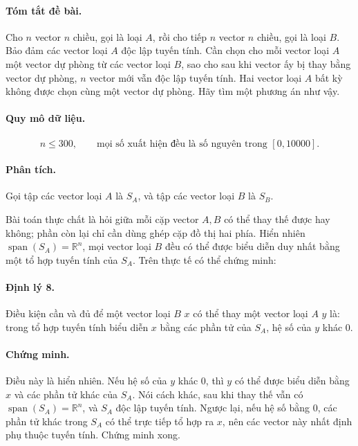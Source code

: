 \documentclass[11pt]{article}
\begin{document}
\paragraph{Tóm tắt đề bài.}
Cho \(n\) vector \(n\) chiều, gọi là loại \(A\), rồi cho tiếp \(n\) vector
\(n\) chiều, gọi là loại \(B\). Bảo đảm các vector loại \(A\) độc lập tuyến
tính. Cần chọn cho mỗi vector loại \(A\) một vector dự phòng từ các vector loại
\(B\), sao cho sau khi vector ấy bị thay bằng vector dự phòng, \(n\) vector mới
vẫn độc lập tuyến tính. Hai vector loại \(A\) bất kỳ không được chọn cùng một
vector dự phòng. Hãy tìm một phương án như vậy.

\paragraph{Quy mô dữ liệu.}
\[
  n\le300,\qquad \text{mọi số xuất hiện đều là số nguyên trong }[0,10000].
\]

\paragraph{Phân tích.}
Gọi tập các vector loại \(A\) là \(S_A\), và tập các vector loại \(B\) là
\(S_B\).

Bài toán thực chất là hỏi giữa mỗi cặp vector \(A,B\) có thể thay thế được hay
không; phần còn lại chỉ cần dùng ghép cặp đồ thị hai phía. Hiển nhiên
\(\operatorname{span}(S_A)=\mathbb{R}^n\), mọi vector loại \(B\) đều có thể được
biểu diễn duy nhất bằng một tổ hợp tuyến tính của \(S_A\). Trên thực tế có thể
chứng minh:

\paragraph{Định lý 8.}
Điều kiện cần và đủ để một vector loại \(B\) \(x\) có thể thay một vector loại
\(A\) \(y\) là: trong tổ hợp tuyến tính biểu diễn \(x\) bằng các phần tử của
\(S_A\), hệ số của \(y\) khác \(0\).

\paragraph{Chứng minh.}
Điều này là hiển nhiên. Nếu hệ số của \(y\) khác \(0\), thì \(y\) có thể được
biểu diễn bằng \(x\) và các phần tử khác của \(S_A\). Nói cách khác, sau khi
thay thế vẫn có \(\operatorname{span}(S_A)=\mathbb{R}^n\), và \(S_A\) độc lập
tuyến tính. Ngược lại, nếu hệ số bằng \(0\), các phần tử khác trong \(S_A\) có
thể trực tiếp tổ hợp ra \(x\), nên các vector này nhất định phụ thuộc tuyến
tính. Chứng minh xong.
\end{document}

